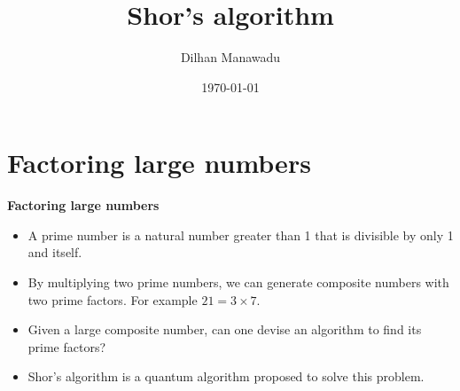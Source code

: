 \documentclass[english]{beamer}
\title{Shor's algorithm}
\author{Dilhan Manawadu}
\date{\today}
\makeatletter
\let\origtableofcontents=\tableofcontents
\def\tableofcontents{\@ifnextchar[{\origtableofcontents}{\gobbletableofcontents}}
\def\gobbletableofcontents#1{\origtableofcontents}
\makeatother
\begin{document}
{      \begin{frame}     \titlepage   \end{frame} }







\section{Factoring large numbers}

\begin{frame}{\textbf{Factoring large numbers}}

\begin{itemize}
\item A prime number is a natural number greater than 1 that is divisible by only 1 and itself.
\item By multiplying two prime numbers, we can generate composite numbers with two prime factors. For example $21 = 3 \times 7$.
\item Given a large composite number, can one devise an algorithm to find its prime factors?
\item Shor's algorithm is a quantum algorithm proposed to solve this problem.

\end{itemize}
\end{frame}
\end{document}

